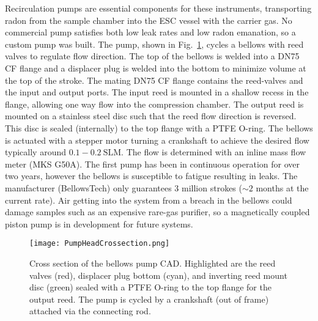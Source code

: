\documentclass[final,3p,times]{elsarticle}
\begin{document}
Recirculation pumps are essential components for these instruments, transporting radon from the sample chamber into the ESC vessel with the carrier gas.
No commercial pump satisfies both low leak rates and low radon emanation, so a custom pump was built. 
The pump, shown in Fig.~\ref{fig:pump_crossection}, cycles a bellows with reed valves to regulate flow direction.
The top of the bellows is welded into a DN75 CF flange and a displacer plug is welded into the bottom to minimize volume at the top of the stroke.
The mating DN75 CF flange contains the reed-valves and the input and output ports.
The input reed is mounted in a shallow recess in the flange, allowing one way flow into the compression chamber.
The output reed is mounted on a stainless steel disc such that the reed flow direction is reversed. This disc is sealed (internally) to the top flange with a PTFE O-ring.
The bellows is actuated with a stepper motor turning a crankshaft to achieve the desired flow typically around $0.1-0.2~\text{SLM}$. The flow is determined with an inline mass flow meter (MKS G50A).
The first pump has been in continuous operation for over two years, however the bellows is susceptible to fatigue resulting in leaks.
The manufacturer (BellowsTech) only guarantees 3 million strokes ($\sim 2$ months at the current rate). 
Air getting into the system from a breach in the bellows could damage samples such as an expensive rare-gas purifier, so a magnetically coupled piston pump \cite{LePort2011,Brown2018} is in development for future systems.
\begin{figure}
\centering
  \texttt{[image: PumpHeadCrossection.png]}
  \caption{Cross section of the bellows pump CAD. Highlighted are the reed valves (red), displacer plug bottom (cyan), and inverting reed mount disc (green) sealed with a PTFE O-ring to the top flange for the output reed. The pump is cycled by a crankshaft (out of frame) attached via the connecting rod.}
  \label{fig:pump_crossection}
\end{figure}
\end{document}
